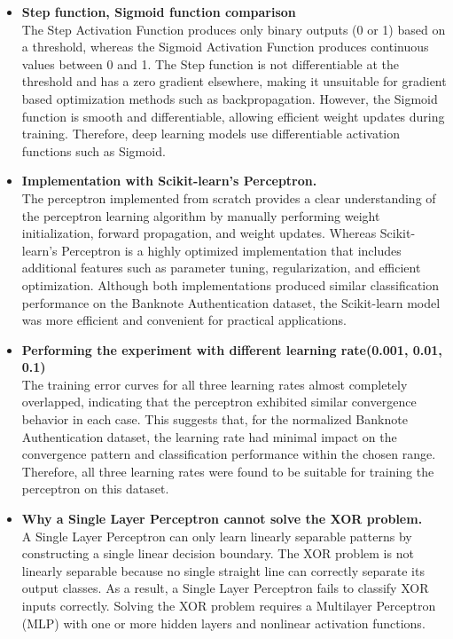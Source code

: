 \documentclass[11pt]{article}
\begin{document}
\begin{itemize}
    \item {\textbf{Step function, Sigmoid function comparison}}\\
    The Step Activation Function produces only binary outputs (0 or 1) based on a threshold, whereas the Sigmoid Activation Function produces continuous values between 0 and 1. The Step function is not differentiable at the threshold and has a zero gradient elsewhere, making it unsuitable for gradient based optimization methods such as backpropagation. However, the Sigmoid function is smooth and differentiable, allowing efficient weight updates during training. Therefore, deep learning models use differentiable activation functions such as Sigmoid.
    \item {\textbf{Implementation with Scikit-learn's Perceptron.}}\\
    The perceptron implemented from scratch provides a clear understanding of the perceptron learning algorithm by manually performing weight initialization, forward propagation, and weight updates. Whereas Scikit-learn's Perceptron is a highly optimized implementation that includes additional features such as parameter tuning, regularization, and efficient optimization. Although both implementations produced similar classification performance on the Banknote Authentication dataset, the Scikit-learn model was more efficient and convenient for practical applications.
    \item {\textbf{Performing the experiment with different learning rate(0.001, 0.01, 0.1)}}\\
    The training error curves for all three learning rates almost completely overlapped, indicating that the perceptron exhibited similar convergence behavior in each case. This suggests that, for the normalized Banknote Authentication dataset, the learning rate had minimal impact on the convergence pattern and classification performance within the chosen range. Therefore, all three learning rates were found to be suitable for training the perceptron on this dataset.
    \item {\textbf{Why a Single Layer Perceptron cannot solve the XOR problem.}}\\
    A Single Layer Perceptron can only learn linearly separable patterns by constructing a single linear decision boundary. The XOR problem is not linearly separable because no single straight line can correctly separate its output classes. As a result, a Single Layer Perceptron fails to classify XOR inputs correctly. Solving the XOR problem requires a Multilayer Perceptron (MLP) with one or more hidden layers and nonlinear activation functions.

\end{itemize}
\end{document}
